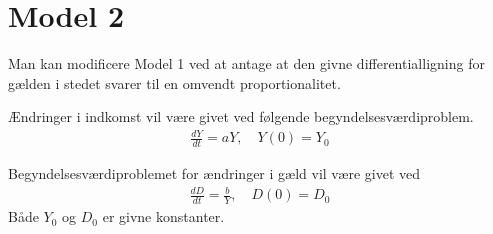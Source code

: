 \section{Model 2}
Man kan modificere Model 1 ved at antage at den givne differentialligning for gælden i stedet svarer til en omvendt proportionalitet.

Ændringer i indkomst vil være givet ved følgende begyndelsesværdiproblem.
\begin{align}
    \frac{dY}{dt} = aY, \quad Y(0) = Y_0
\end{align}

Begyndelsesværdiproblemet for ændringer i gæld vil være givet ved
\begin{align}
    \frac{dD}{dt} = \frac{b}{Y}, \quad D(0) = D_0
\end{align}
Både $Y_0$ og $D_0$ er givne konstanter.
